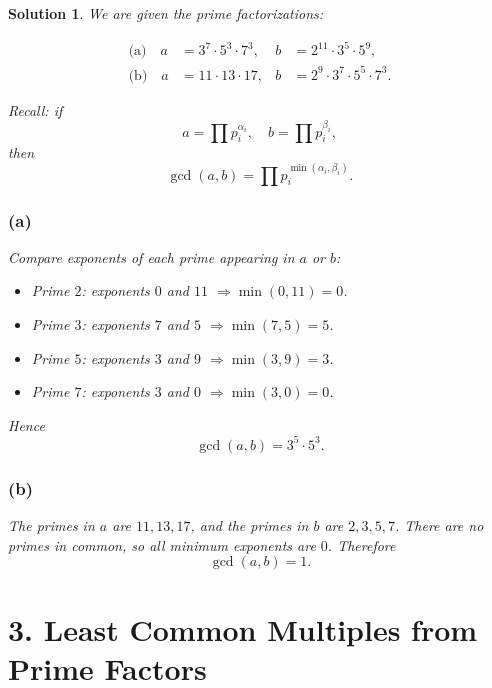 \documentclass[11pt]{article}
\newtheorem*{solution}{Solution}
\begin{document}
\begin{solution}
We are given the prime factorizations:

\begin{align*}
\text{(a)}\quad
a &= 3^7 \cdot 5^3 \cdot 7^3, &
b &= 2^{11} \cdot 3^5 \cdot 5^9,\\[4pt]
\text{(b)}\quad
a &= 11 \cdot 13 \cdot 17, &
b &= 2^9 \cdot 3^7 \cdot 5^5 \cdot 7^3.
\end{align*}

Recall: if
\[
a = \prod p_i^{\alpha_i},\quad b = \prod p_i^{\beta_i},
\]
then
\[
\gcd(a,b) = \prod p_i^{\min(\alpha_i,\beta_i)}.
\]

\subsubsection*{(a)}
Compare exponents of each prime appearing in $a$ or $b$:

\begin{itemize}
  \item Prime $2$: exponents $0$ and $11$ $\Rightarrow \min(0,11)=0$.
  \item Prime $3$: exponents $7$ and $5$ $\Rightarrow \min(7,5)=5$.
  \item Prime $5$: exponents $3$ and $9$ $\Rightarrow \min(3,9)=3$.
  \item Prime $7$: exponents $3$ and $0$ $\Rightarrow \min(3,0)=0$.
\end{itemize}

Hence
\[
\gcd(a,b) = 3^5 \cdot 5^3.
\]

\subsubsection*{(b)}
The primes in $a$ are $11,13,17$, and the primes in $b$ are $2,3,5,7$. 
There are no primes in common, so all minimum exponents are $0$. Therefore
\[
\gcd(a,b) = 1.
\]
\end{solution}

\section*{3. Least Common Multiples from Prime Factors}
\end{document}
